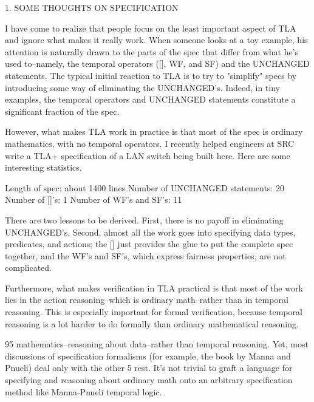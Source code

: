 % 
% 
% 


\begin{spec}
1. SOME THOUGHTS ON SPECIFICATION

I have come to realize that people focus on the least important
aspect of TLA and ignore what makes it really work.  When someone
looks at a toy example, his attention is naturally drawn to the
parts of the spec that differ from what he's used to--namely, the
temporal operators ([], WF, and SF) and the UNCHANGED statements.
The typical initial reaction to TLA is to try to "simplify" specs by
introducing some way of eliminating the UNCHANGED's.  Indeed, in
tiny examples, the temporal operators and UNCHANGED statements
constitute a significant fraction of the spec.

However, what makes TLA work in practice is that most of the spec is
ordinary mathematics, with no temporal operators.  I recently helped
engineers at SRC write a TLA+ specification of a LAN switch being
built here.  Here are some interesting statistics.

   Length of spec: about 1400 lines
   Number of UNCHANGED statements: 20 
   Number of []'s: 1
   Number of WF's and SF's: 11

There are two lessons to be derived.  First, there is no payoff in
eliminating UNCHANGED's.  Second, almost all the work goes into
specifying data types, predicates, and actions; the [] just provides
the glue to put the complete spec together, and the WF's and SF's,
which express fairness properties, are not complicated.

Furthermore, what makes verification in TLA practical is that most
of the work lies in the action reasoning--which is ordinary
math--rather than in temporal reasoning.  This is especially
important for formal verification, because temporal reasoning is a
lot harder to do formally than ordinary mathematical reasoning.

95%
mathematics--reasoning about data--rather than temporal reasoning.
Yet, most discussions of specification formalisms (for example, the
book by Manna and Pnueli) deal only with the other 5%
rest.  It's not trivial to graft a language for specifying and
reasoning about ordinary math onto an arbitrary specification method
like Manna-Pnueli temporal logic.


\end{spec}
